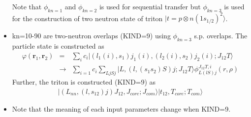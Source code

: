 \documentclass[11pt]{book}
\def\bm{\boldsymbol}
\def\vr{{\bm r}}
\def\ra{\rangle}
\newcommand{\bea}{\begin{eqnarray}}
\newcommand{\eea}{\end{eqnarray}}
\newcommand{\no}{\nonumber \\}
\begin{document}
\begin{small}
\begin{itemize}
      Note that $\phi_{kn=1}$ and $\phi_{kn=2}$ is used for sequential transfer
      but $\phi_{kn=3}$ is used for the construction of two neutron
      state of triton $|t=p\otimes n(1s_{1/2})^2\ra $.

\item  kn=10-90 are two-neutron overlaps (KIND=9) using $\phi_{kn=3}$ s.p. overlaps. 
      The particle state is constructed as
      \bea 
      \varphi(\vr_1,\vr_2)&=&\sum_i c_i |(l_1(i),s_1)j_1(i),(l_2(i),s_2)j_2(i); J_{12} T\ra    
      \no 
      &\to& \sum_{i=1} c_i \sum_{Lj S j}
        |L,(l,(s_1s_2)S)j;J_{12}T\ra \phi^{J_{12}T,i}_{L(lS)j}(r,\rho)
      \eea   
      Further, the triton is constructed (KIND=9) as
      \bea 
      |(L_{nn},(l,s_{12})j)J_{12}, J_{core};J_{com}\ra|t_{12},T_{core};T_{com}\ra 
      \eea 
\item Note that the meaning of each input parameters change 
      when KIND=9. 
      

\end{itemize}
\end{small}
\end{document}
